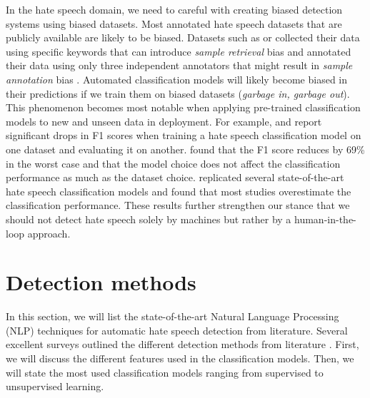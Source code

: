 %
In the hate speech domain, we need to careful with creating biased detection systems using biased datasets.
%
Most annotated hate speech datasets that are publicly available are likely to be biased.
%
%
Datasets such as \citet{waseem2016hateful} or \citet{basile2019semeval} collected their data using specific keywords that can introduce \textit{sample retrieval} bias and annotated their data using only three independent annotators that might result in \textit{sample annotation} bias \citep{balayn2021automatic}.
%
Automated classification models will likely become biased in their predictions if we train them on biased datasets (\emph{garbage in, garbage out}).
%
This phenomenon becomes most notable when applying pre-trained classification models to new and unseen data in deployment.
%
For example, \citet{grondahl2018all} and \citet{arango2019hate} report significant drops in F1 scores when training a hate speech classification model on one dataset and evaluating it on another.
%
\citet{grondahl2018all} found that the F1 score reduces by 69\% in the worst case and that the model choice does not affect the classification performance as much as the dataset choice.
%
\citet{arango2019hate} replicated several state-of-the-art hate speech classification models and found that most studies overestimate the classification performance.
%
These results further strengthen our stance that we should not detect hate speech solely by machines but rather by a human-in-the-loop approach.

\section{Detection methods}
\label{sec:related-work-detection-algorithms}
%
In this section, we will list the state-of-the-art Natural Language Processing (NLP) techniques for automatic hate speech detection from literature.
%
Several excellent surveys outlined the different detection methods from literature  \citep{fortuna2018survey, schmidt2019survey}.
%
First, we will discuss the different features used in the classification models.
%
Then, we will state the most used classification models ranging from supervised to unsupervised learning.
%

